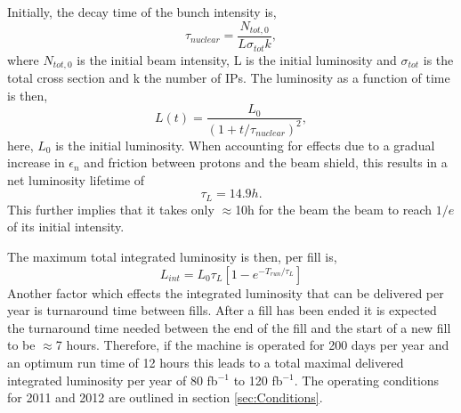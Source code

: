 Initially, the decay time of the bunch intensity is,
\begin{equation}
\tau_{nuclear}=\frac{N_{tot,0}}{L\sigma_{tot}k},
\end{equation}
where $N_{tot,0}$ is the initial beam intensity, L is the initial
luminosity and $\sigma_{tot}$ is the total cross section and 
k the number of IPs.
The luminosity as a function of time is then,
\begin{equation}
L(t)=\frac{L_{0}}{(1+t/\tau_{nuclear})^{2}},
\end{equation}
here, $L_{0}$ is the initial luminosity.
When accounting for effects due to a gradual increase in
 $\epsilon_{n}$ and friction between protons and the 
 beam shield, this results in a net luminosity lifetime of 
\begin{equation}
\tau_{L} = 14.9 h .
\end{equation}
This further implies that it takes only $\approx$10h for the
beam the beam to reach $1/e$ of its initial intensity.

The maximum total integrated luminosity is then,
per fill is,
\begin{equation}
L_{int}=L_{0}\tau_{L}\left[ 1-e^{-T_{run}/\tau_{L}}\right]
\end{equation}
Another factor which effects the integrated luminosity that can
be delivered per year is turnaround time between fills.
After a fill has been ended it is expected the turnaround time
needed between the end of the fill and the start of a new fill
to be $\approx$7 hours. Therefore, if the machine is operated for 200 days
per year and an optimum run time of 12 hours this leads to a 
total maximal delivered integrated luminosity per year of 80 fb$^{-1}$
to 120 fb$^{-1}$. The operating conditions for 2011 and 2012
are outlined in section \ref{sec:Conditions}.

